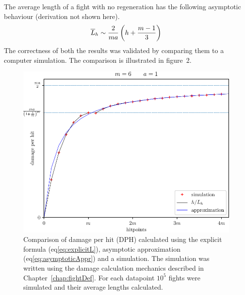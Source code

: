 The average length of a fight with no regeneration has the following asymptotic behaviour (derivation not shown here).
\begin{align}\label{eq:asymptoticAppr}
\overline{L}_h \sim \frac{2}{ma}\left(h + \frac{m-1}{3}\right)
\end{align}
The correctness of both the results was validated by comparing them to a computer simulation. The comparison is illustrated in figure~2.
\begin{figure}[t]\label{fig:apprComparison}
    \includegraphics[scale=1.1]{dph-appr-m6.pdf}
    \caption{Comparison of damage per hit (DPH) calculated using the explicit formula (eq\ref{eq:explicitL}), asymptotic approximation (eq\ref{eq:asymptoticAppr}) and a simulation. The simulation was written using the damage calculation mechanics described in Chapter~\ref{chap:fightDef}. For each datapoint $10^{5}$ fights were simulated and their average lengths calculated.}
\end{figure}

